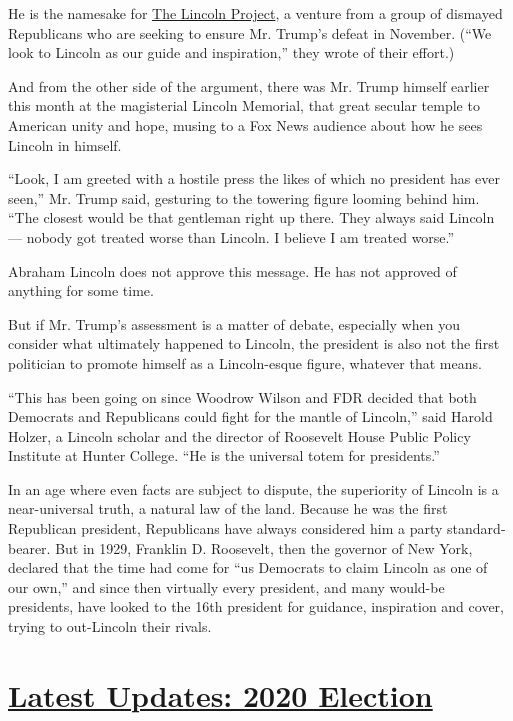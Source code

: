 He is the namesake for \href{https://lincolnproject.us/}{The Lincoln
Project}, a venture from a group of dismayed Republicans who are seeking
to ensure Mr. Trump's defeat in November. (``We look to Lincoln as our
guide and inspiration,'' they wrote of their effort.)

And from the other side of the argument, there was Mr. Trump himself
earlier this month at the magisterial Lincoln Memorial, that great
secular temple to American unity and hope, musing to a Fox News audience
about how he sees Lincoln in himself.

``Look, I am greeted with a hostile press the likes of which no
president has ever seen,'' Mr. Trump said, gesturing to the towering
figure looming behind him. ``The closest would be that gentleman right
up there. They always said Lincoln --- nobody got treated worse than
Lincoln. I believe I am treated worse.''

Abraham Lincoln does not approve this message. He has not approved of
anything for some time.

But if Mr. Trump's assessment is a matter of debate, especially when you
consider what ultimately happened to Lincoln, the president is also not
the first politician to promote himself as a Lincoln-esque figure,
whatever that means.

``This has been going on since Woodrow Wilson and FDR decided that both
Democrats and Republicans could fight for the mantle of Lincoln,'' said
Harold Holzer, a Lincoln scholar and the director of Roosevelt House
Public Policy Institute at Hunter College. ``He is the universal totem
for presidents.''

In an age where even facts are subject to dispute, the superiority of
Lincoln is a near-universal truth, a natural law of the land. Because he
was the first Republican president, Republicans have always considered
him a party standard-bearer. But in 1929, Franklin D. Roosevelt, then
the governor of New York, declared that the time had come for ``us
Democrats to claim Lincoln as one of our own,'' and since then virtually
every president, and many would-be presidents, have looked to the 16th
president for guidance, inspiration and cover, trying to out-Lincoln
their rivals.

\hypertarget{latest-updates-2020-election}{%
\section{\texorpdfstring{\href{https://www.nytimes.com/2020/07/31/us/elections/biden-vs-trump.html?action=click\&pgtype=Article\&state=default\&region=MAIN_CONTENT_1\&context=storylines_live_updates}{Latest
Updates: 2020
Election}}{Latest Updates: 2020 Election}}\label{latest-updates-2020-election}}

